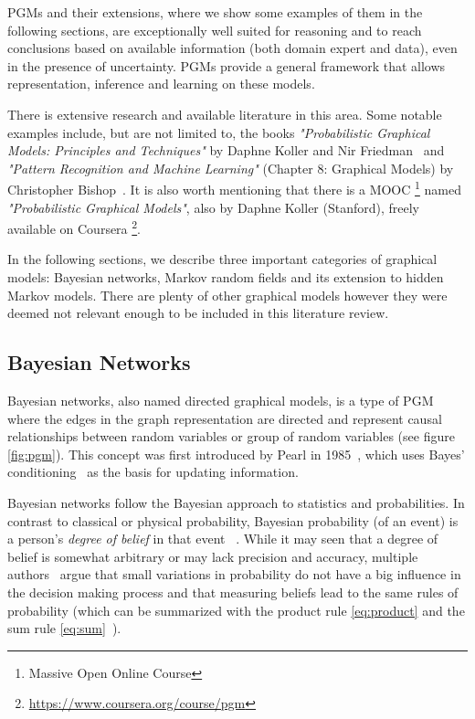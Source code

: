 PGMs and their extensions, where we show some examples of them in the following 
sections, are exceptionally well suited for reasoning and to reach conclusions 
based on available information (both domain expert and data), even in the 
presence of uncertainty. PGMs provide a general framework that allows 
representation, inference and learning on these 
models.~\cite{koller2009probabilistic}

There is extensive research and available literature in this area. Some notable 
examples include, but are not limited to, the books \textit{"Probabilistic 
    Graphical Models: Principles and Techniques"} by Daphne Koller and Nir 
Friedman~\cite{koller2009probabilistic} and \textit{"Pattern Recognition and 
    Machine Learning"} (Chapter 8: Graphical Models) by Christopher 
Bishop~\cite{bishop2006pattern}. It is also worth mentioning that there is a 
MOOC \footnote{Massive Open Online Course} named \textit{"Probabilistic 
    Graphical Models"}, also by Daphne Koller (Stanford), freely available on 
Coursera \footnote{\url{https://www.coursera.org/course/pgm}}.

In the following sections, we describe three important categories of graphical 
models: Bayesian networks, Markov random fields and its extension to hidden 
Markov models. There are plenty of other graphical models however they were 
deemed not relevant enough to be included in this literature review.

\subsection{Bayesian Networks}

Bayesian networks, also named directed graphical models, is a type of PGM where 
the edges in the graph representation are directed and represent causal 
relationships between random variables or group of random variables (see figure 
\ref{fig:pgm}). This concept was first introduced by Pearl in 
1985~\cite{Pearl1985}, which uses Bayes' conditioning~\cite{bayes1763essay} as 
the basis for updating information.

Bayesian networks follow the Bayesian approach to statistics and probabilities. 
In contrast to classical or physical probability, Bayesian probability (of an 
event) is a person's \textit{degree of belief} in that event 
~\cite{Heckerman1996}. While it may seen that a degree of belief is somewhat 
arbitrary or may lack precision and accuracy, multiple 
authors~\cite{Ramsey1931, Tversky1974, Shachter1988} argue that small 
variations in probability do not have a big influence in the decision making 
process and that measuring beliefs lead to the same rules of probability (which 
can be summarized with the product rule \ref{eq:product} and the sum rule 
\ref{eq:sum}~\cite{MacKay2005}). 

